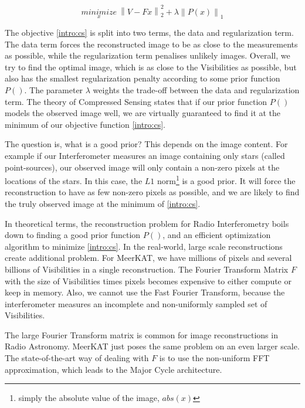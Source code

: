 \begin{equation}\label{intro:cs}
\underset{x}{minimize} \: \left \| V - Fx \right \|_2^2 + \lambda \left \| P(x) \right \|_1
\end{equation}

The objective \eqref{intro:cs} is split into two terms, the data and regularization term. The data term forces the reconstructed image to be as close to the measurements as possible, while the regularization term penalises unlikely images. Overall, we try to find the optimal image, which is as close to the Visibilities as possible, but also has the smallest regularization penalty according to some prior function $P()$. The parameter $\lambda$ weights the trade-off between the data and regularization term. The theory of Compressed Sensing states that if our prior function $P()$ models the observed image well, we are virtually guaranteed to find it at the minimum of our objective function \eqref{intro:cs}.

The question is, what is a good prior? This depends on the image content. For example if our Interferometer measures an image containing only stars (called point-sources), our observed image will only contain a non-zero pixels at the locations of the stars. In this case, the $L1$ norm\footnote{simply the absolute value of the image, $abs(x)$} is a good prior. It will force the reconstruction to have as few non-zero pixels as possible, and we are likely to find the truly observed image at the minimum of \eqref{intro:cs}.

In theoretical terms, the reconstruction problem for Radio Interferometry boils down to finding a good prior function $P()$, and an efficient optimization algorithm to minimize \eqref{intro:cs}. In the real-world, large scale reconstructions create additional problem. For MeerKAT, we have millions of pixels and several billions of Visibilities in a single reconstruction. The Fourier Transform Matrix $F$ with the size of Visibilities times pixels becomes expensive to either compute or keep in memory. Also, we cannot use the Fast Fourier Transform, because the interferometer measures an incomplete and non-uniformly sampled set of Visibilities.

The large Fourier Transform matrix is common for image reconstructions in Radio Astronomy. MeerKAT just poses the same problem on an even larger scale.
The state-of-the-art way of dealing with $F$ is to use the non-uniform FFT approximation, which leads to the Major Cycle architecture. 

